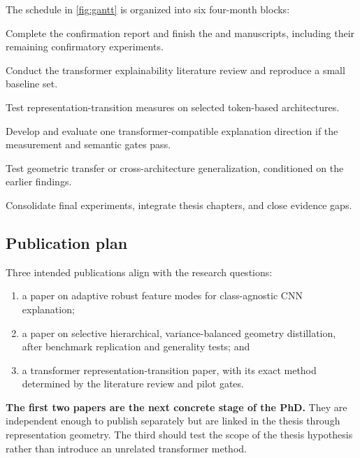 The schedule in \cref{fig:gantt} is organized into six four-month blocks:

\begin{description}[leftmargin=2.6cm,style=nextline]
    \item[Sep--Dec 2026] Complete the confirmation report and finish the
    \methodname{} and \jmethod{} manuscripts, including their remaining
    confirmatory experiments.
    \item[Jan--Apr 2027] Conduct the transformer explainability literature
    review and reproduce a small baseline set.
    \item[May--Aug 2027] Test representation-transition measures on selected
    token-based architectures.
    \item[Sep--Dec 2027] Develop and evaluate one transformer-compatible
    explanation direction if the measurement and semantic gates pass.
    \item[Jan--Apr 2028] Test geometric transfer or cross-architecture
    generalization, conditioned on the earlier findings.
    \item[May--Aug 2028] Consolidate final experiments, integrate thesis
    chapters, and close evidence gaps.
\end{description}

\subsection{Publication plan}

Three intended publications align with the research questions:

\begin{enumerate}[leftmargin=*]
    \item a \methodname{} paper on adaptive robust feature modes for
    class-agnostic CNN explanation;
    \item a \jmethod{} paper on selective hierarchical, variance-balanced
    geometry distillation, after benchmark replication and generality tests;
    and
    \item a transformer representation-transition paper, with its exact method
    determined by the literature review and pilot gates.
\end{enumerate}

\textbf{The first two papers are the next concrete stage of the PhD.} They are
independent enough to publish separately but are linked in the thesis through
representation geometry. The third should test the scope of the thesis
hypothesis rather than introduce an unrelated transformer method.

